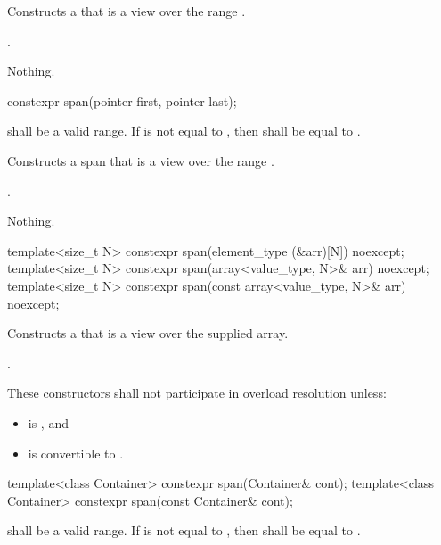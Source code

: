 \begin{codeblock}
\begin{codeblock}
\begin{codeblock}
\begin{itemdescr}
\pnum
\effects
Constructs a  that is a view over the range .

\pnum
\postconditions
{}.

\pnum
\throws
Nothing.
\end{itemdescr}

%
\begin{itemdecl}
constexpr span(pointer first, pointer last);
\end{itemdecl}
\begin{itemdescr}
\pnum
\requires
{} shall be a valid range.
If  is not equal to ,
then  shall be equal to .

\pnum
\effects
Constructs a span that is a view over the range .

\pnum
\postconditions
{}.

\pnum
\throws
Nothing.
\end{itemdescr}

%
\begin{itemdecl}
template<size_t N> constexpr span(element_type (&arr)[N]) noexcept;
template<size_t N> constexpr span(array<value_type, N>& arr) noexcept;
template<size_t N> constexpr span(const array<value_type, N>& arr) noexcept;
\end{itemdecl}
\begin{itemdescr}
\pnum
\effects
Constructs a  that is a view over the supplied array.

\pnum
\postconditions
{}.

\pnum
\remarks
These constructors shall not participate in overload resolution unless:
\begin{itemize}
\item {} is , and
\item {} is convertible to .
\end{itemize}
\end{itemdescr}

%
\begin{itemdecl}
template<class Container> constexpr span(Container& cont);
template<class Container> constexpr span(const Container& cont);
\end{itemdecl}
\begin{itemdescr}
\pnum
\requires
{} shall be a valid range.
If  is not equal to ,
then  shall be equal to .


\end{itemdescr}
\end{codeblock}
\end{codeblock}
\end{codeblock}
